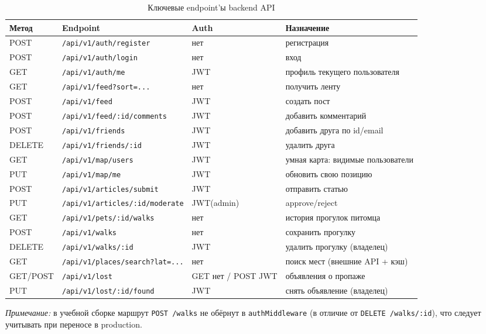 \documentclass[12pt,a4paper]{article}
\newcommand{\code}[1]{{\small\texttt{#1}}}
\begin{document}
\begin{table}[H]
\centering
\small
\caption{Ключевые endpoint'ы backend API}
\begin{tabular}{|L{0.15\textwidth}|L{0.38\textwidth}|L{0.16\textwidth}|L{0.21\textwidth}|}
\hline
\textbf{Метод} & \textbf{Endpoint} & \textbf{Auth} & \textbf{Назначение} \\
\hline
POST & \code{/api/v1/auth/register} & нет & регистрация \\
\hline
POST & \code{/api/v1/auth/login} & нет & вход \\
\hline
GET & \code{/api/v1/auth/me} & JWT & профиль текущего пользователя \\
\hline
GET & \code{/api/v1/feed?sort=...} & нет & получить ленту \\
\hline
POST & \code{/api/v1/feed} & JWT & создать пост \\
\hline
POST & \code{/api/v1/feed/:id/comments} & JWT & добавить комментарий \\
\hline
POST & \code{/api/v1/friends} & JWT & добавить друга по id/email \\
\hline
DELETE & \code{/api/v1/friends/:id} & JWT & удалить друга \\
\hline
GET & \code{/api/v1/map/users} & JWT & умная карта: видимые пользователи \\
\hline
PUT & \code{/api/v1/map/me} & JWT & обновить свою позицию \\
\hline
POST & \code{/api/v1/articles/submit} & JWT & отправить статью \\
\hline
PUT & \code{/api/v1/articles/:id/moderate} & JWT(admin) & approve/reject \\
\hline
GET & \code{/api/v1/pets/:id/walks} & нет & история прогулок питомца \\
\hline
POST & \code{/api/v1/walks} & нет & сохранить прогулку \\
\hline
DELETE & \code{/api/v1/walks/:id} & JWT & удалить прогулку (владелец) \\
\hline
GET & \code{/api/v1/places/search?lat=...} & нет & поиск мест (внешние API + кэш) \\
\hline
GET/POST & \code{/api/v1/lost} & GET нет / POST JWT & объявления о пропаже \\
\hline
PUT & \code{/api/v1/lost/:id/found} & JWT & снять объявление (владелец) \\
\hline
\end{tabular}
\end{table}

\noindent\textit{Примечание:} в учебной сборке маршрут \code{POST /walks} не обёрнут в \code{authMiddleware} (в отличие от \code{DELETE /walks/:id}), что следует учитывать при переносе в production.
\end{document}
